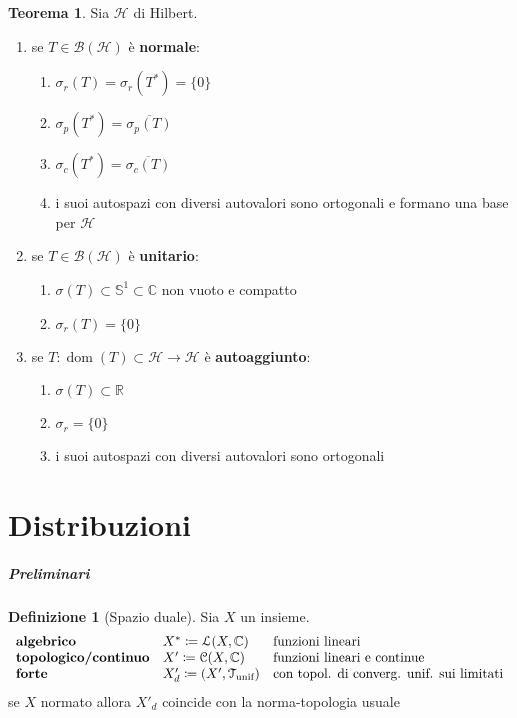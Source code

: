 \documentclass[a4paper,10pt]{article}
\theoremstyle{definition}
\DeclareMathOperator*{\dom}{dom} %
\newcommand{\re}{\mathbb{R}} %
\newcommand{\im}{\mathbb{C}} %
\newcommand{\hil}{\mathcal{H}} %
\theoremstyle{indentdefinition}
\newtheorem{defn}{Definizione}[section]
\theoremstyle{indenttheorem}
\newtheorem{thm}{Teorema}
\theoremstyle{myremark}
\theoremstyle{indentgeneral}
\begin{document}
\begin{thm}
    Sia $\hil$ di Hilbert.
    
    \begin{enumerate}
    \item se $T\in\mathcal{B}(\hil)$ è \textbf{normale}:
        \begin{enumerate}
            \item $\sigma_r(T)=\sigma_r(T^*)=\{0\}$
            \item $\sigma_p(T^*)=\overline{\sigma_p(T)}$
            \item $\sigma_c(T^*)=\overline{\sigma_c(T)}$
             \item i suoi autospazi con diversi autovalori sono ortogonali e formano una base per $\hil$
        \end{enumerate}
        \item se $T\in\mathcal{B}(\hil)$ è \textbf{unitario}:
        \begin{enumerate}
            \item $\sigma(T)\subset\mathbb{S}^1\subset\im$ non vuoto e compatto
            \item $\sigma_r(T)=\{0\}$
        \end{enumerate}
        
        \item se $T:\dom(T)\subset\hil\to\hil$ è \textbf{autoaggiunto}:
        \begin{enumerate}
            \item $\sigma(T)\subset\re$
            \item $\sigma_r=\{0\}$
            \item i suoi autospazi con diversi autovalori sono ortogonali
            
        \end{enumerate}
    \end{enumerate}
\end{thm}



\pagebreak
\part{Distribuzioni}
\subsubsection{Preliminari}
\begin{defn}[Spazio duale] Sia $X$ un insieme.
     $$\begin{array}{lll}
      \text{\textbf{algebrico}} & X^*\coloneqq\mathcal{L}(X,\im) & \text{funzioni lineari} \\
       \text{\textbf{topologico/continuo}} & X'\coloneqq\mathcal{C}(X,\im) & \text{funzioni lineari e continue} \\
       \text{\textbf{forte}} & X'_d\coloneqq(X',\mathcal{T}_{\text{unif}}) & \text{con topol. di converg. unif. sui limitati}
    \end{array}$$
    se $X$ normato allora $X'_d$ coincide con la norma-topologia usuale
\end{defn}
\end{document}

